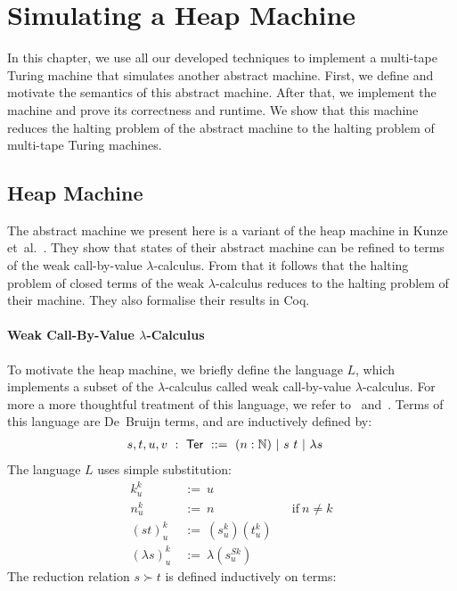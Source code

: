\chapter{Simulating a Heap Machine}
\label{chap:heap}

\newcommand{\subst}[3]{{#1}^{#2}_{#3}}
\newcommand{\Ter}{\MS{Ter}}
\newcommand{\red}{\succ}


In this chapter, we use all our developed techniques to implement a multi-tape Turing machine that simulates another abstract machine.  First, we
define and motivate the semantics of this abstract machine.  After that, we implement the machine and prove its correctness and runtime.  We show that
this machine reduces the halting problem of the abstract machine to the halting problem of multi-tape Turing machines.

\section{Heap Machine}
\label{sec:heap}

The abstract machine we present here is a variant of the heap machine in Kunze et~al.~\cite{KunzeEtAl:2018:Formal}.  They show that states of their
abstract machine can be refined to terms of the weak call-by-value $\lambda$-calculus.  From that it follows that the halting problem of closed terms
of the weak $\lambda$-calculus reduces to the halting problem of their machine.  They also formalise their results in Coq.

\subsubsection{Weak Call-By-Value $\lambda$-Calculus}
\label{sec:L}

To motivate the heap machine, we briefly define the language $L$, which implements a subset of the $\lambda$-calculus called weak call-by-value
$\lambda$-calculus.  For more a more thoughtful treatment of this language, we refer to~\cite{ForsterSmolka17} and~\cite{KunzeEtAl:2018:Formal}.
Terms of this language are De~Bruijn terms, and are inductively defined by:
\begin{align*}
  s,t,u,v &~:~\Ter~::=~ (n:\Nat) ~|~ s~t ~|~ \lambda s
\end{align*}
The language $L$ uses simple substitution:
\begin{align*}
  \subst kku &~:=~u \\
  \subst nku &~:=~n &&\text{if}~n\neq k \\
  \subst{(st)}ku &~:=~(\subst sku)(\subst tku) \\
  \subst{(\lambda s)}ku &~:=~\lambda(\subst s{Sk}u)
\end{align*}
The reduction relation $s \red t$ is defined inductively on terms:


